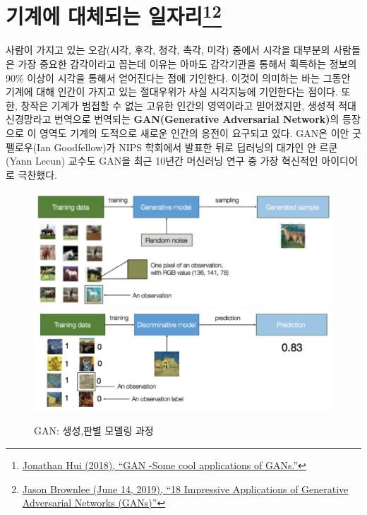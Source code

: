 \documentclass[smallextended]{svjour3}       %
\begin{document}
\cite{brynjolfsson2014second} \cite{ford2015rise}
\cite{kaplan2015humans} \cite{cummings2014man} \cite{brownlee_2019}
\cite{chang_2017} \cite{ahlstrom_2019} \cite{wikipedia_2019}
\cite{hui_2018} \cite{zdnet_2019}

\hypertarget{challenge-to-human}{%
\section[기계에 대체되는 일자리]{\texorpdfstring{기계에 대체되는
일자리\footnote{\href{https://medium.com/@jonathan_hui/gan-some-cool-applications-of-gans-4c9ecca35900}{Jonathan
  Hui (2018), ``GAN -Some cool applications of GANs.''}}\footnote{\href{https://machinelearningmastery.com/impressive-applications-of-generative-adversarial-networks/}{Jason
  Brownlee (June 14, 2019), ``18 Impressive Applications of Generative
  Adversarial Networks (GANs)''}}}{기계에 대체되는 일자리}}\label{challenge-to-human}}

사람이 가지고 있는 오감(시각, 후각, 청각, 촉각, 미각) 중에서 시각을
대부분의 사람들은 가장 중요한 감각이라고 꼽는데 이유는 아마도 감각기관을
통해서 획득하는 정보의 90\% 이상이 시각을 통해서 얻어진다는 점에
기인한다. 이것이 의미하는 바는 그동안 기계에 대해 인간이 가지고 있는
절대우위가 사실 시각지능에 기인한다는 점이다. 또한, 창작은 기계가 범접할
수 없는 고유한 인간의 영역이라고 믿어졌지만, 생성적 적대 신경망라고
번역으로 번역되는 \textbf{GAN(Generative Adversarial Network)}의
등장으로 이 영역도 기계의 도적으로 새로운 인간의 응전이 요구되고 있다.
GAN은 이안 굿펠로우(Ian Goodfellow)가 NIPS 학회에서 발표한 뒤로 딥러닝의
대가인 얀 르쿤(Yann Lecun) 교수도 GAN을 최근 10년간 머신러닝 연구 중
가장 혁신적인 아이디어로 극찬했다.

\begin{figure}

{\centering \includegraphics[width=0.49\linewidth]{fig/generative-model} \includegraphics[width=0.49\linewidth]{fig/discriminative-model} 

}

\caption{GAN: 생성,판별 모델링 과정}\label{fig:unnamed-chunk-3}
\end{figure}
\end{document}
